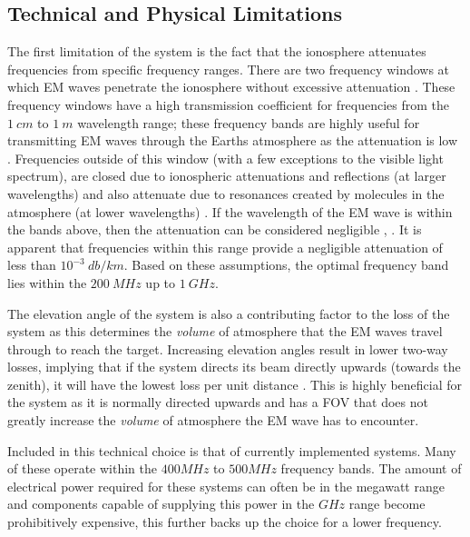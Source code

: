 \documentclass[11pt]{witseiepaper}
\begin{document}
\begin{bibunit}[witseie]
\subsection{Technical and Physical Limitations} \label{sec:TechnicalandPhysicalLimitations}
The first limitation of the system is the fact that the ionosphere attenuates frequencies from specific frequency ranges. There are two frequency windows at which EM waves penetrate the ionosphere without excessive attenuation \cite{ObjectInformation}.
These frequency windows have a high transmission coefficient for frequencies from the $1~cm$ to $1~m$ wavelength range; these frequency bands are highly useful for transmitting EM waves through the Earths atmosphere as the attenuation is low \cite{frequencyAttenuation}. Frequencies outside of this window (with a few exceptions to the visible light spectrum), are closed due to ionospheric attenuations and reflections (at larger wavelengths) and also attenuate due to resonances created by molecules in the atmosphere (at lower wavelengths) \cite{frequencyAttenuation}.  
If the wavelength of the EM wave is within the bands above, then the attenuation can be considered negligible \cite{ionosphereAttenuationStandard}, \cite[p.~15,124]{radarHandbook}. It is apparent that frequencies within this range provide a negligible attenuation of less than $10^{-3}~db/km$.
Based on these assumptions, the optimal frequency band lies within the $200~MHz$ up to $1~GHz$. %

The elevation angle of the system is also a contributing factor to the loss of the system as this determines the \textit{volume} of atmosphere that the EM waves travel through to reach the target. Increasing elevation angles result in lower two-way losses, implying that if the system directs its beam directly upwards (towards the zenith), it will have the lowest loss per unit distance \cite[p.~70]{elevationLoss}. This is highly beneficial for the system as it is normally directed upwards and has a FOV that does not greatly increase the \textit{volume} of atmosphere the EM wave has to encounter.


Included in this technical choice is that of currently implemented systems. Many of these operate within the $400 MHz$ to $500 MHz$ frequency bands.
The amount of electrical power required for these systems can often be in the megawatt range and components capable of supplying this power in the $GHz$ range become prohibitively expensive, this further backs up the choice for a lower frequency.


\end{bibunit}
\end{document}

